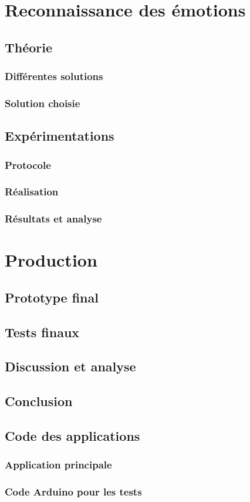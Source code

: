 \documentclass{report}
\begin{document}
	\part{Reconnaissance des \'emotions}
		\chapter{Th\'eorie}
			\section{Diff\'erentes solutions}
			\section{Solution choisie}
		\chapter{Exp\'erimentations}
			\section{Protocole}
			\section{R\'ealisation}
			\section{R\'esultats et analyse}
	\part{Production}
		\chapter{Prototype final}
		\chapter{Tests finaux}
		\chapter{Discussion et analyse}
	\chapter*{Conclusion}
\appendix
	\chapter{Code des applications}
		\section{Application principale}
		\section{Code Arduino pour les tests}
			
\end{document}

